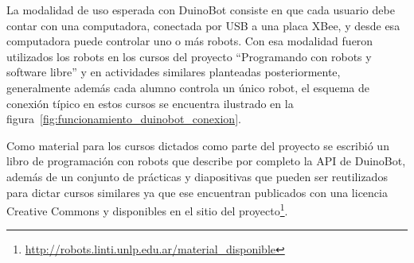 La modalidad de uso esperada con DuinoBot consiste en que cada usuario
debe contar con una computadora, conectada por USB a una placa XBee,
y desde esa computadora puede controlar uno o más robots. Con esa modalidad
fueron utilizados los robots en los cursos del proyecto
``Programando con robots y software libre'' y en actividades similares
planteadas posteriormente, generalmente además cada alumno controla
un único robot, el esquema de conexión típico en estos cursos se encuentra
ilustrado en la figura~\ref{fig:funcionamiento_duinobot_conexion}.

Como material para los cursos dictados como parte del proyecto \proyecto{}
se escribió un libro de programación con robots que describe por completo
la API de DuinoBot, además de un conjunto de prácticas y diapositivas que pueden
ser reutilizados para dictar cursos similares ya que ese encuentran publicados
con una licencia Creative Commons y disponibles en el sitio del
proyecto\footnote{\url{http://robots.linti.unlp.edu.ar/material_disponible}}.

